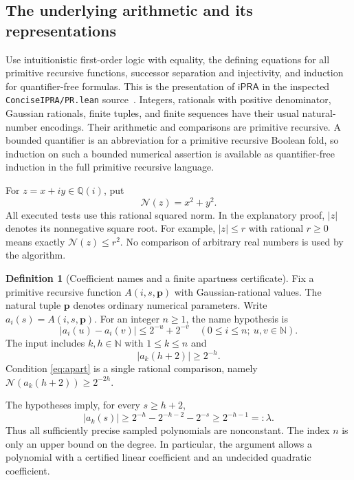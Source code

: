 \documentclass[11pt,letterpaper]{article}
\theoremstyle{definition}\newtheorem{definition}[theorem]{Definition}
\theoremstyle{remark}\newtheorem{remark}[theorem]{Remark}
\newcommand{\ipra}{\mathsf{iPRA}}
\newcommand{\N}{\mathbb N}\newcommand{\Q}{\mathbb Q}
\newcommand{\GQ}{\mathbb Q(i)}\newcommand{\C}{\mathbb C}
\newcommand{\nn}[1]{\mathcal N(#1)}
\begin{document}
\subsection{The underlying arithmetic and its representations}

Use intuitionistic first-order logic with equality, the defining equations
for all primitive recursive functions, successor separation and injectivity,
and induction for quantifier-free formulas. This is the presentation of
$\ipra$ in the inspected \texttt{ConciseIPRA/PR.lean} source~\cite{proveit-pr}.
Integers, rationals with positive denominator, Gaussian rationals, finite
tuples, and finite sequences have their usual natural-number encodings.
Their arithmetic and comparisons are primitive recursive. A bounded
quantifier is an abbreviation for a primitive recursive Boolean fold, so
induction on such a bounded numerical assertion is available as
quantifier-free induction in the full primitive recursive language.

For $z=x+iy\in\GQ$, put
\[
 \nn z=x^2+y^2.
\]
All executed tests use this rational squared norm. In the explanatory proof,
$|z|$ denotes its nonnegative square root. For example,
$|z|\le r$ with rational $r\ge0$ means exactly $\nn z\le r^2$.
No comparison of arbitrary real numbers is used by the algorithm.

\begin{definition}[Coefficient names and a finite apartness certificate]
Fix a primitive recursive function $A(i,s,\mathbf p)$ with Gaussian-rational
values. The natural tuple $\mathbf p$ denotes ordinary numerical parameters.
Write $a_i(s)=A(i,s,\mathbf p)$. For an integer $n\ge1$, the name hypothesis is
\begin{equation}
 |a_i(u)-a_i(v)|\le 2^{-u}+2^{-v}
 \quad(0\le i\le n;\ u,v\in\N).
 \tag{N}\label{eq:names}
\end{equation}
The input includes $k,h\in\N$ with $1\le k\le n$ and
\begin{equation}
 |a_k(h+2)|\ge 2^{-h}.
 \tag{A}\label{eq:apart}
\end{equation}
Condition \eqref{eq:apart} is a single rational comparison, namely
$\nn{a_k(h+2)}\ge 2^{-2h}$.
\end{definition}

The hypotheses imply, for every $s\ge h+2$,
\begin{equation}
 |a_k(s)|\ge 2^{-h}-2^{-h-2}-2^{-s}
                 \ge 2^{-h-1}=:\lambda.
 \label{eq:apart-tail}
\end{equation}
Thus all sufficiently precise sampled polynomials are nonconstant.
The index $n$ is only an upper bound on the degree. In particular, the
argument allows a polynomial with a certified linear coefficient and an
undecided quadratic coefficient.
\end{document}
